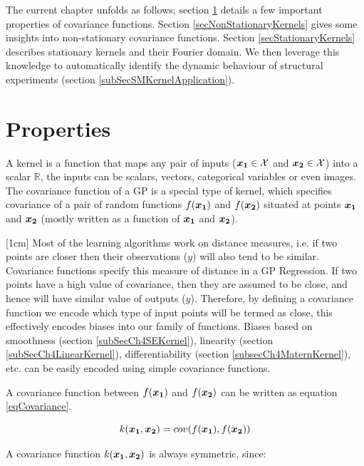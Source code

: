 The current chapter unfolds as follows; section \ref{secPropertiesOfCovariance} details a few important properties of covariance functions. Section \ref{secNonStationaryKernels} gives some insights into non-stationary covariance functions. Section \ref{secStationaryKernels} describes stationary kernels and their Fourier domain. We then leverage this knowledge to automatically identify the dynamic behaviour of structural experiments (section \ref{subSecSMKernelApplication}). 

\section{Properties}\label{secPropertiesOfCovariance}
A kernel is a function that maps any pair of inputs ($\boldsymbol{x_1} \in \mathcal{X}$ and $\boldsymbol{x_2} \in \mathcal{X}$) into a scalar $\mathbb{R}$, the inputs can be scalars, vectors, categorical variables \cite{villegas2013investigation} or even images. The covariance function of a GP is a special type of kernel, which specifies covariance of a pair of random functions $f(\boldsymbol{x_{1}})$ and $f(\boldsymbol{x_{2}})$ situated at points $\boldsymbol{x_{1}}$ and $\boldsymbol{x_{2}}$ (mostly written as a function of $\boldsymbol{x_{1}}$ and $\boldsymbol{x_{2}}$). 

[1cm]
Most of the learning algorithms work on distance measures, i.e. if two points are closer then their observations ($y$) will also tend to be similar. Covariance functions specify this measure of distance in a GP Regression. If two points have a high value of covariance, then they are assumed to be close, and hence will have similar value of outputs ($y$). Therefore, by defining a covariance function we encode which type of input points will be termed as close, this effectively encodes biases into our family of functions. Biases based on smoothness (section \ref{subSecCh4SEKernel}), linearity (section \ref{subSecCh4LinearKernel}), differentiability (section \ref{subsecCh4MaternKernel}), etc. can be easily encoded using simple covariance functions.

A covariance function between $f(\boldsymbol{x_{1}})$ and $f(\boldsymbol{x_{2}})$ can be written as equation \ref{eqCovariance}.

\begin{equation}\label{eqCovariance}
    k(\boldsymbol{x_{1}}, \boldsymbol{x_{2}}) = cov(f(\boldsymbol{x_{1}}), f(\boldsymbol{x_{2}}))
\end{equation}

A covariance function $k(\boldsymbol{x_{1}}, \boldsymbol{x_{2}})$ is always symmetric, since: 

